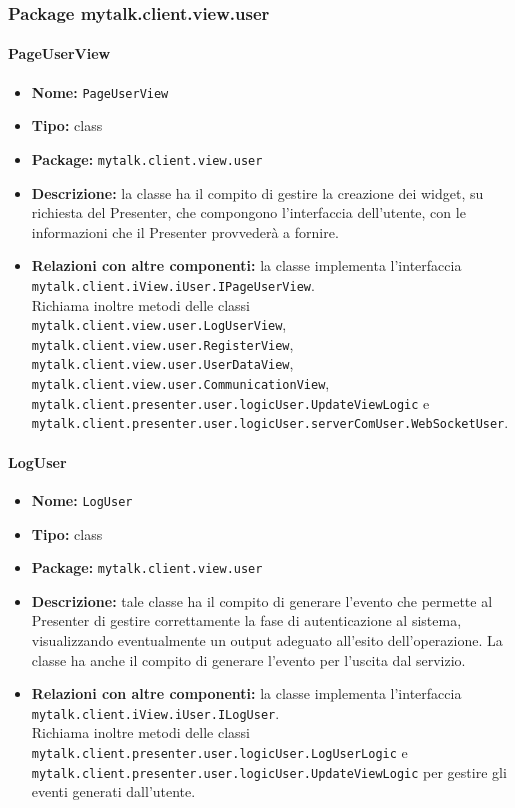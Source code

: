 {\subsubsection{Package mytalk.client.view.user}{
\paragraph{PageUserView}{
	\begin{itemize}
		\item [] \textbf{Nome:} \texttt{PageUserView}
		\item [] \textbf{Tipo:} class
		\item [] \textbf{Package:} \texttt{mytalk.client.view.user}
		\item [] \textbf{Descrizione:} la classe ha il compito di gestire la creazione dei widget\g, su richiesta del Presenter, che compongono l'interfaccia dell'utente, con le informazioni che il Presenter provvederà a fornire.
		\item [] \textbf{Relazioni con altre componenti:} la classe implementa l'interfaccia\\ \texttt{mytalk.client.iView.iUser.IPageUserView}.\\
		Richiama inoltre metodi delle classi \\
		\texttt{mytalk.client.view.user.LogUserView},
		\texttt{mytalk.client.view.user.RegisterView}, \\
		\texttt{mytalk.client.view.user.UserDataView}, \\
		\texttt{mytalk.client.view.user.CommunicationView}, \\
		\texttt{mytalk.client.presenter.user.logicUser.UpdateViewLogic} e \\
		\texttt{mytalk.client.presenter.user.logicUser.serverComUser.WebSocketUser}.
	\end{itemize}
}
\paragraph{LogUser}{
	\begin{itemize}
		\item [] \textbf{Nome:} \texttt{LogUser}
		\item [] \textbf{Tipo:} class
		\item [] \textbf{Package:} \texttt{mytalk.client.view.user}
		\item [] \textbf{Descrizione:} tale classe ha il compito di generare l'evento che permette al Presenter di gestire correttamente la fase di autenticazione al sistema, visualizzando eventualmente un output adeguato all'esito dell'operazione. La classe ha anche il compito di generare l'evento per l'uscita dal servizio.
		\item [] \textbf{Relazioni con altre componenti:} la classe implementa l'interfaccia\\ \texttt{mytalk.client.iView.iUser.ILogUser}.\\
		Richiama inoltre metodi delle classi \\
		\texttt{mytalk.client.presenter.user.logicUser.LogUserLogic} e \\ \texttt{mytalk.client.presenter.user.logicUser.UpdateViewLogic}
		per gestire gli eventi generati dall'utente.
	\end{itemize}
}
}}
